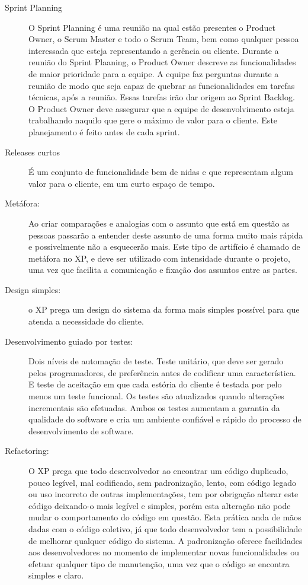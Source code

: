 \begin{description}
  \item [Sprint Planning] O Sprint Planning é uma reunião na qual estão presentes o Product Owner, o Scrum Master e todo o Scrum Team, bem como qualquer pessoa interessada que esteja representando a gerência ou cliente. Durante a reunião do Sprint Plaaning, o Product Owner descreve as funcionalidades de maior prioridade para a equipe. A equipe faz perguntas durante a reunião de modo que seja capaz de quebrar as funcionalidades em tarefas técnicas, após a reunião. Essas tarefas irão dar origem ao Sprint Backlog. O Product Owner deve assegurar que a equipe de desenvolvimento esteja trabalhando naquilo que gere o máximo de valor para o cliente. Este planejamento é feito antes de cada sprint. 

  \item [Releases curtos] É um conjunto de funcionalidade bem de nidas e que representam algum valor para o cliente, em um curto espaço de tempo.

  \item [Metáfora:] Ao criar comparações e analogias com o assunto que está em questão as pessoas passarão a entender deste assunto de uma forma muito mais rápida e possivelmente não a esquecerão mais. Este tipo de artifício é chamado de metáfora no XP, e deve ser utilizado com intensidade durante o projeto, uma vez que facilita a comunicação e fixação dos assuntos entre as partes.

  \item [Design simples:] o XP prega um design do sistema da forma mais simples possível para que atenda a necessidade do cliente.

  \item [Desenvolvimento guiado por testes:] Dois níveis de automação de teste. Teste unitário, que deve ser gerado pelos programadores, de preferência antes de codificar uma característica. E teste de aceitação em que cada estória do cliente é testada por pelo menos um teste funcional. Os testes são atualizados quando alterações incrementais são efetuadas. Ambos os testes aumentam a garantia da qualidade do software e cria um ambiente confiável e rápido do processo de desenvolvimento de software.

  \item [Refactoring:] O XP prega que todo desenvolvedor ao encontrar um código duplicado, pouco legível, mal codificado, sem padronização, lento, com código legado ou uso incorreto de outras implementações, tem por obrigação alterar este código deixando-o mais legível e simples, porém esta alteração não pode mudar o comportamento do código em questão. Esta prática anda de mãos dadas com o código coletivo, já que todo desenvolvedor tem a possibilidade de melhorar qualquer código do sistema. A padronização oferece facilidades aos desenvolvedores no momento de implementar novas funcionalidades ou efetuar qualquer tipo de manutenção, uma vez que o código se encontra simples e claro.


\end{description}
